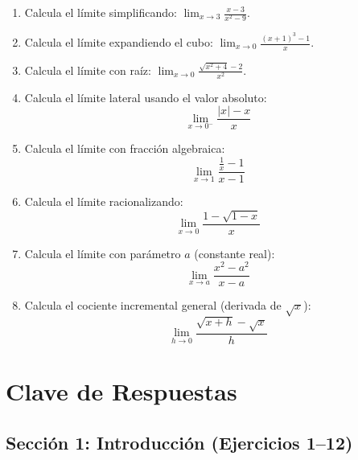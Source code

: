 \documentclass[12pt, letterpaper]{article}
\begin{document}
\begin{enumerate}[resume=ejercicios, leftmargin=*]
  \item \facil{} Calcula el límite simplificando: $\displaystyle\lim_{x \to 3} \frac{x - 3}{x^2 - 9}$.

  \item \medio{} Calcula el límite expandiendo el cubo: $\displaystyle\lim_{x \to 0} \frac{(x + 1)^3 - 1}{x}$.

  \item \medio{} Calcula el límite con raíz: $\displaystyle\lim_{x \to 0} \frac{\sqrt{x^2 + 4} - 2}{x^2}$.

  \item \medio{} Calcula el límite lateral usando el valor absoluto:
        $$\lim_{x \to 0^-} \frac{|x| - x}{x}$$

  \item \dificil{} Calcula el límite con fracción algebraica:
        $$\lim_{x \to 1} \frac{\frac{1}{x} - 1}{x - 1}$$

  \item \dificil{} Calcula el límite racionalizando:
        $$\lim_{x \to 0} \frac{1 - \sqrt{1 - x}}{x}$$

  \item \muyDificil{} Calcula el límite con parámetro $a$ (constante real):
        $$\lim_{x \to a} \frac{x^2 - a^2}{x - a}$$

  \item \muyDificil{} Calcula el cociente incremental general (derivada de $\sqrt{x}$):
        $$\lim_{h \to 0} \frac{\sqrt{x + h} - \sqrt{x}}{h}$$
\end{enumerate}
\newpage
\ifmwclaves
  \section{Clave de Respuestas}

  \subsection*{Sección 1: Introducción (Ejercicios 1--12)}
\end{document}
